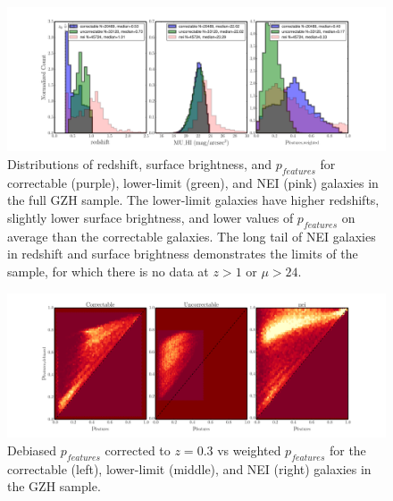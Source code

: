 \documentclass[twocolumn]{aastex6}
\begin{document}
\begin{figure}
\center
\includegraphics[width=\textwidth]{figures/hubble_z_mu_p_distributions.pdf}
\caption{Distributions of redshift, surface brightness, and $p_{features}$ for correctable (purple), lower-limit (green), and NEI (pink) galaxies in the full GZH sample. The lower-limit galaxies have higher redshifts, slightly lower surface brightness, and lower values of $p_{features}$ on average than the correctable galaxies. The long tail of NEI galaxies in redshift and surface brightness demonstrates the limits of the \ferengi{} sample, for which there is no data at $z>1$ or $\mu>24$.}
\label{fig:z_mu_p}
\end{figure}

\begin{figure}
\center
\includegraphics[width=\textwidth]{figures/debiased_corrections.pdf}
\caption{Debiased $p_{features}$ corrected to $z=0.3$ vs weighted $p_{features}$ for the correctable (left), lower-limit (middle), and NEI (right) galaxies in the GZH sample.}
\label{fig:debiased_corrections}
\end{figure}
\end{document}
